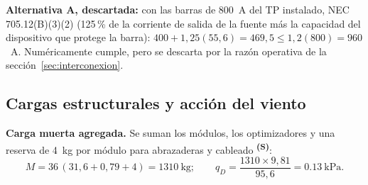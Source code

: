 \documentclass[12pt]{article}
\newcommand{\supuesto}{\textsuperscript{\textcolor{orange!80!black}{\textbf{(S)}}}}
\begin{document}
\textbf{Alternativa A, descartada:} con las barras de 800~A del TP instalado, NEC 705.12(B)(3)(2) (125\,\% de la corriente de salida de la fuente más la capacidad del dispositivo que protege la barra): $400+1{,}25(55{,}6)=469{,}5\leq1{,}2(800)=960$~A. Numéricamente cumple, pero se descarta por la razón operativa de la sección~\ref{sec:interconexion}.

\subsection{Cargas estructurales y acción del viento}
\label{sec:estructura}
\textbf{Carga muerta agregada.} Se suman los módulos, los optimizadores y una reserva de 4~kg por módulo para abrazaderas y cableado \supuesto{}:
\begin{equation}
M=36\,(31{,}6+0{,}79+4)=\SI{1310}{\kilogram};\qquad q_D=\frac{1310\times9{,}81}{95{,}6}=\SI{0.13}{\kilo\pascal}.
\end{equation}
\end{document}

